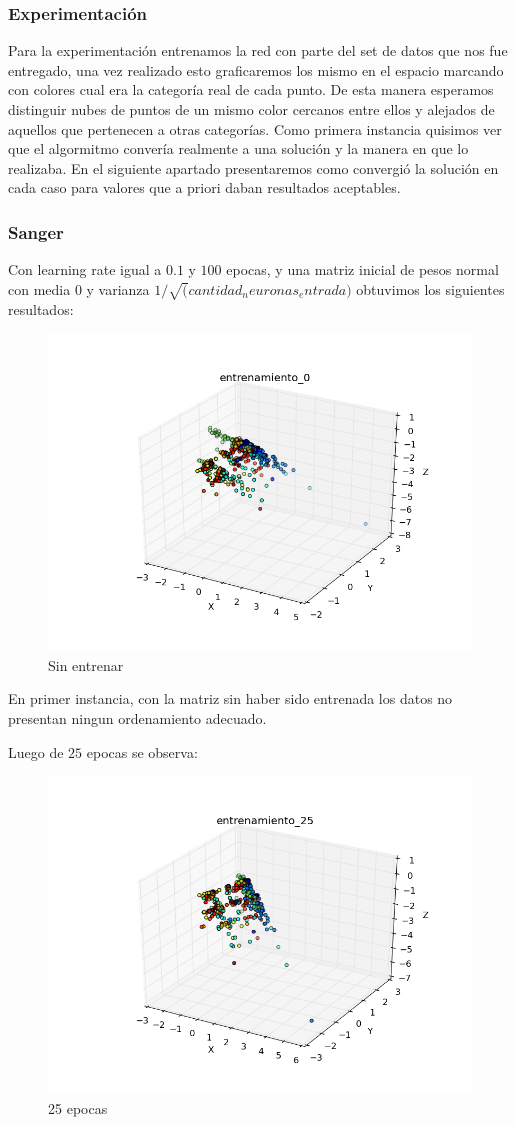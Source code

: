 \subsubsection{Experimentación}

Para la experimentación entrenamos la red con parte del set de datos que nos fue entregado, una vez realizado esto graficaremos los mismo en el espacio marcando con colores cual era la categoría real de cada punto. De esta manera esperamos distinguir nubes de puntos de un mismo color cercanos entre ellos y alejados de aquellos que pertenecen a otras categorías. Como primera instancia quisimos ver que el algormitmo convería realmente a una solución y la manera en que lo realizaba. En el siguiente apartado presentaremos como convergió la solución en cada caso para valores que a priori daban resultados aceptables.

\subsubsection{Sanger}

Con learning rate igual a $0.1$ y $100$ epocas, y una matriz inicial de pesos normal con media 0 y varianza $1/\sqrt(cantidad_neuronas_entrada)$ obtuvimos los siguientes resultados:

\begin{figure}[h!]
\centering
  \centering
  \includegraphics[width=.6\linewidth]{convergencia_oja/entrenamiento_0.png}
\caption{Sin entrenar}
\label{fig:test}
\end{figure}

En primer instancia, con la matriz sin haber sido entrenada los datos no presentan ningun ordenamiento adecuado.

\pagebreak

Luego de $25$ epocas se observa: 

\begin{figure}[h!]
  \centering
  \includegraphics[width=.6\linewidth]{convergencia_oja/entrenamiento_25.png}
\caption{25 epocas}
\label{fig:test}
\end{figure}

